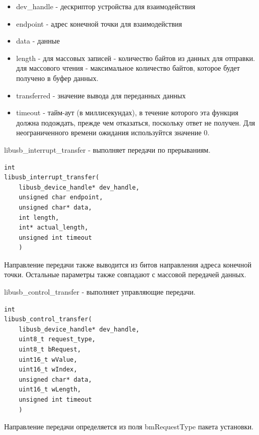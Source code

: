 \documentclass[14pt,a4paper]{article}
\begin{document}
\begin{itemize}
    \item dev\_handle - дескриптор устройства для взаимодействия
    \item endpoint - адрес конечной точки для взаимодействия
    \item data - данные 
    \item length - для массовых записей - количество байтов из данных для отправки. для массового чтения - максимальное количество байтов, которое будет получено в буфер данных.
    \item transferred - значение вывода для переданных данных
    \item timeout - тайм-аут (в миллисекундах), в течение которого эта функция должна подождать, прежде чем отказаться, поскольку ответ не получен. Для неограниченного времени ожидания используйтся значение 0.
\end{itemize}

libusb\_interrupt\_transfer - выполняет передачи по прерываниям.

\begin{lstlisting}[language=c caption={}]
int
libusb_interrupt_transfer(
    libusb_device_handle* dev_handle,
    unsigned char endpoint,
    unsigned char* data,
    int length,
    int* actual_length,
    unsigned int timeout
    )
\end{lstlisting}

\par Направление передачи также выводится из битов направления адреса конечной точки. Остальные параметры также совпадают с массовой передачей данных.

\par libusb\_control\_transfer - выполняет управляющие передачи.\\

\begin{lstlisting}[language=c caption={}]
int
libusb_control_transfer(
    libusb_device_handle* dev_handle,
    uint8_t request_type,
    uint8_t bRequest,
    uint16_t wValue,
    uint16_t wIndex,
    unsigned char* data,
    uint16_t wLength,
    unsigned int timeout
    )
\end{lstlisting}

\par Направление передачи определяется из поля bmRequestType пакета установки.
\end{document}
